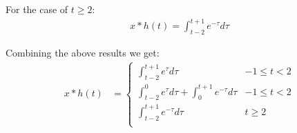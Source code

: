 \documentclass{article}
\begin{document}
For the case of $t \geq 2$:
\begin{equation*}
\begin{split}
    x * h(t) = \int_{t - 2}^{t + 1}e^{-\tau}d\tau
\end{split}
\end{equation*}

Combining the above results we get:
\begin{equation*}
\begin{split}
    x * h(t)
    &= \begin{cases}
        \int_{t - 2}^{t + 1}e^{\tau}d\tau & -1 \leq t < 2\\
        \int_{t - 2}^{0}e^{\tau}d\tau + \int_{0}^{t + 1}e^{-\tau}d\tau & -1 \leq t < 2\\
        \int_{t - 2}^{t + 1}e^{-\tau}d\tau & t \geq 2\\
    \end{cases}\\
\end{split}
\end{equation*}
\end{document}
